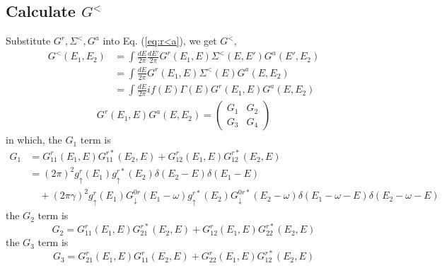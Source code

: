 \documentclass[11pt,a4paper]{article}
\begin{document}
\subsection{Calculate $G^{<}$}
Substitute $G^{r}, \Sigma^{<}, G^{a}$ into Eq. (\ref{eq:r<a}), we get $G^{<}$,
\begin{equation}
\begin{split}
G^{<}(E_{1},E_{2})&=\int\frac{dE}{2\pi}\frac{dE'}{2\pi}G^{r}(E_{1}, E) \Sigma^{<}(E, E') G^{a}(E', E_{2}) \\
&= \int \frac{dE}{2\pi} G^{r}\left(E_{1}, E\right) \Sigma^{<}\left(E\right) G^{a}\left(E, E_{2}\right) \\
&= \int \frac{dE}{2\pi} if(E)\Gamma(E) G^{r}\left(E_{1}, E\right) G^{a}\left(E, E_{2}\right)
\end{split}
\end{equation}
\begin{equation}
\begin{split}
G^{r}\left(E_{1}, E\right) G^{a}\left(E, E_{2}\right) =
\left(\begin{array}{cc}
G_{1} & G_{2} \\
G_{3} & G_{4}
\end{array}\right)
\end{split}
\end{equation}
in which, the $G_{1}$ term is
\begin{equation}
\begin{split}
G_{1} &= G_{11}^{r}(E_{1}, E)G_{11}^{r*}(E_{2},E)+G_{12}^{r}(E_{1},E)G_{12}^{r*}(E_{2},E) \\
&= (2 \pi)^{2} g_{\uparrow}^{r}\left(E_{1}\right)  g_{\uparrow}^{r*}\left(E_{2}\right) \delta\left(E_{2}-E\right) \delta\left(E_{1}-E\right) \\
&\quad + (2 \pi \gamma)^{2} g_{\uparrow}^{r}\left(E_{1}\right) G_{\downarrow}^{0r}\left(E_{1}-\omega\right)  g_{\uparrow}^{r*}\left(E_{2}\right) G_{\downarrow}^{0r*}\left(E_{2}-\omega\right) \delta\left(E_{1}-\omega-E\right) \delta\left(E_{2}-\omega-E\right)
\end{split}
\end{equation}
the $G_{2}$ term is
\begin{equation}
G_{2} = G_{11}^{r}(E_{1}, E)G_{21}^{r*}(E_{2},E) + G_{12}^{r}(E_{1}, E)G_{22}^{r*}(E_{2},E)
\end{equation}
the $G_{3}$ term is
\begin{equation}
G_{3} = G_{21}^{r}(E_{1},E)G_{11}^{r}(E_{2},E) + G_{22}^{r}(E_{1},E)G_{12}^{r*}(E_{2},E)
\end{equation}
\end{document}
